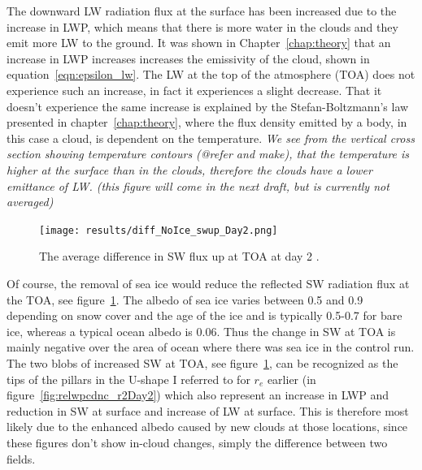 The downward LW radiation flux at the surface has been increased due to the increase in LWP, which means that there is more water in the clouds and they emit more LW to the ground. It was shown in Chapter~\ref{chap:theory} that an increase in LWP increases increases the emissivity of the cloud, shown in equation~\ref{eqn:epsilon_lw}. The LW at the top of the atmosphere (TOA) does not experience such an increase, in fact it experiences a slight decrease. That it doesn't experience the same increase is explained by the Stefan-Boltzmann's law presented in chapter~\ref{chap:theory}, where the flux density emitted by a body, in this case a cloud, is dependent on the temperature. %
\textit{ We see from the vertical cross section showing temperature contours (@refer and make), that the temperature is higher at the surface than in the clouds, therefore the clouds have a lower emittance of LW. (this figure will come in the next draft, but is currently not averaged)}

\begin{figure}
\centering
\texttt{[image: results/diff\_NoIce\_swup\_Day2.png]}
\caption{The average difference in SW flux up at TOA at day 2 .}
\label{fig:swupdiff_r2Day2}
\end{figure}
Of course, the removal of sea ice would reduce the reflected SW radiation flux at the TOA, see figure~\ref{fig:swupdiff_r2Day2}. The albedo of sea ice varies between 0.5 and 0.9 depending on snow cover and the age of the ice and is typically 0.5-0.7 for bare ice, whereas a typical ocean albedo is 0.06. Thus the change in SW at TOA is mainly negative over the area of ocean where there was sea ice in the control run. The two blobs of increased SW at TOA, see figure~\ref{fig:swupdiff_r2Day2}, can be recognized as the tips of the pillars in the U-shape I referred to for $r_e$ earlier (in figure~\ref{fig:relwpcdnc_r2Day2}) which also represent an increase in LWP and reduction in SW at surface and increase of LW at surface. This is therefore most likely due to the enhanced albedo caused by new clouds at those locations, since these figures don't show in-cloud changes, simply the difference between two fields.

